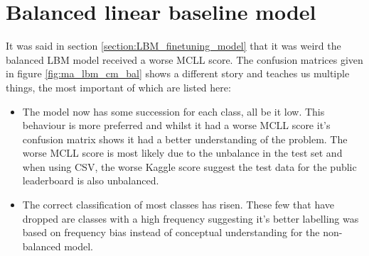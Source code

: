 
\section{Balanced linear baseline model}
\label{section:ma_lbm_balanced}

It was said in section \ref{section:LBM_finetuning_model} that it was weird the balanced LBM model received a worse MCLL score.
The confusion matrices given in figure \ref{fig:ma_lbm_cm_bal} shows a different story and teaches us multiple things, the most important of which are listed here:
\begin{itemize}
    \item The model now has some succession for each class, all be it low. This behaviour is more preferred and whilst it had a worse MCLL score it's confusion matrix shows it had a better understanding of the problem. The worse MCLL score is most likely due to the unbalance in the test set and when using CSV, the worse Kaggle score suggest the test data for the public leaderboard is also unbalanced.
    \item The correct classification of most classes has risen. These few that have dropped are classes with a high frequency suggesting it's better labelling was based on frequency bias instead of conceptual understanding for the non-balanced model. 
\end{itemize}

